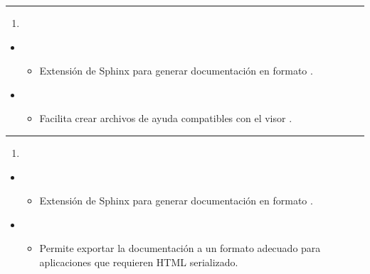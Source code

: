 \documentclass[a4paper,10pt,oneside,spanish,openany]{sphinxmanual}
\begin{document}
\bigskip\hrule\bigskip

\begin{enumerate}
%
\setcounter{enumi}{36}
\item {} 
\sphinxAtStartPar
{}

\end{enumerate}
\begin{itemize}
\item {} 
\sphinxAtStartPar
{}
\begin{itemize}
\item {} 
\sphinxAtStartPar
Extensión de Sphinx para generar documentación en formato .

\end{itemize}

\item {} 
\sphinxAtStartPar
{}
\begin{itemize}
\item {} 
\sphinxAtStartPar
Facilita crear archivos de ayuda compatibles con el visor .

\end{itemize}

\end{itemize}


\bigskip\hrule\bigskip

\begin{enumerate}
%
\setcounter{enumi}{37}
\item {} 
\sphinxAtStartPar
{}

\end{enumerate}
\begin{itemize}
\item {} 
\sphinxAtStartPar
{}
\begin{itemize}
\item {} 
\sphinxAtStartPar
Extensión de Sphinx para generar documentación en formato .

\end{itemize}

\item {} 
\sphinxAtStartPar
{}
\begin{itemize}
\item {} 
\sphinxAtStartPar
Permite exportar la documentación a un formato adecuado para aplicaciones que requieren HTML serializado.

\end{itemize}

\end{itemize}
\end{document}
